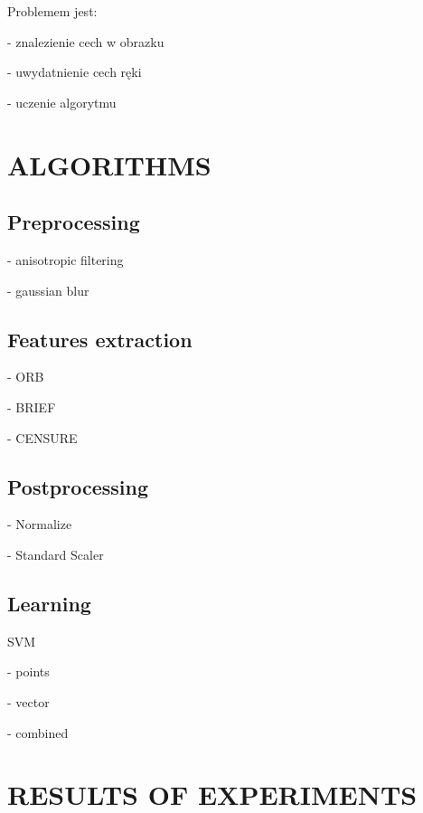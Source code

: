 \documentclass[11pt,a4paper]{article}
\begin{document}
Problemem jest:

- znalezienie cech w obrazku

- uwydatnienie cech ręki

- uczenie algorytmu


\section{ALGORITHMS}

\subsection{Preprocessing}

- anisotropic filtering

- gaussian blur

\subsection{Features extraction}

- ORB

- BRIEF

- CENSURE 

\subsection{Postprocessing}

- Normalize

- Standard Scaler 

\subsection{Learning}

SVM

- points

- vector

- combined


\section{RESULTS OF EXPERIMENTS}
\end{document}
